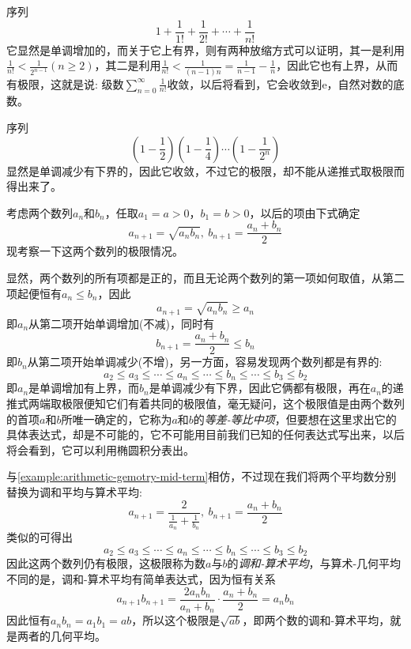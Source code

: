\begin{example}
  序列
  \[ 1+\frac{1}{1!} + \frac{1}{2!} + \cdots + \frac{1}{n!} \]
  它显然是单调增加的，而关于它上有界，则有两种放缩方式可以证明，其一是利用$\frac{1}{n!}<\frac{1}{2^{n-1}}(n \geqslant 2)$，其二是利用$\frac{1}{n!}<\frac{1}{(n-1)n}=\frac{1}{n-1}-\frac{1}{n}$，因此它也有上界，从而有极限，这就是说: 级数$\sum\limits_{n=0}^{\infty} \frac{1}{n!}$收敛，以后将看到，它会收敛到$\mathrm{e}$，自然对数的底数。
\end{example}

\begin{example}
  序列
  \[ \left( 1-\frac{1}{2} \right) \left( 1-\frac{1}{4} \right) \cdots \left( 1-\frac{1}{2^n} \right) \]
  显然是单调减少有下界的，因此它收敛，不过它的极限，却不能从递推式取极限而得出来了。
\end{example}

\begin{example}[等差-等比中项]
  \label{example:arithmetic-gemotry-mid-term}
  考虑两个数列$a_n$和$b_n$，任取$a_1=a>0$，$b_1=b>0$，以后的项由下式确定
  \[ a_{n+1} = \sqrt{a_nb_n}, \  b_{n+1}=\frac{a_n+b_n}{2} \]
  现考察一下这两个数列的极限情况。

  显然，两个数列的所有项都是正的，而且无论两个数列的第一项如何取值，从第二项起便恒有$a_n \leqslant b_n$，因此
  \[ a_{n+1} = \sqrt{a_nb_n} \geqslant a_n \]
  即$a_n$从第二项开始单调增加(不减)，同时有
  \[ b_{n+1} = \frac{a_n+b_n}{2} \leqslant b_n \]
  即$b_n$从第二项开始单调减少(不增)，另一方面，容易发现两个数列都是有界的:
  \[ a_2 \leqslant a_3 \leqslant \cdots \leqslant a_n \leqslant \cdots \leqslant b_n \leqslant \cdots \leqslant b_3 \leqslant b_2  \]
  即$a_n$是单调增加有上界，而$b_n$是单调减少有下界，因此它俩都有极限，再在$a_n$的递推式两端取极限便知它们有着共同的极限值，毫无疑问，这个极限值是由两个数列的首项$a$和$b$所唯一确定的，它称为$a$和$b$的\emph{等差-等比中项}，但要想在这里求出它的具体表达式，却是不可能的，它不可能用目前我们已知的任何表达式写出来，以后将会看到，它可以利用椭圆积分表出。
\end{example}

\begin{example}[调和-算术中项]
  \label{example:harmonic-arithmetic-mid-term}
  与\autoref{example:arithmetic-gemotry-mid-term}相仿，不过现在我们将两个平均数分别替换为调和平均与算术平均:
  \[ a_{n+1} = \frac{2}{\frac{1}{a_n}+\frac{1}{b_n}}, \  b_{n+1} = \frac{a_n+b_n}{2} \]
  类似的可得出
  \[ a_2 \leqslant a_3 \leqslant \cdots \leqslant a_n \leqslant \cdots \leqslant b_n \leqslant \cdots \leqslant b_3 \leqslant b_2  \]
  因此这两个数列仍有极限，这极限称为数$a$与$b$的\emph{调和-算术平均}，与算术-几何平均不同的是，调和-算术平均有简单表达式，因为恒有关系
  \[ a_{n+1}b_{n+1} = \frac{2a_nb_n}{a_n+b_n} \cdot \frac{a_n+b_n}{2} = a_nb_n \]
  因此恒有$a_nb_n=a_1b_1=ab$，所以这个极限是$\sqrt{ab}$，即两个数的调和-算术平均，就是两者的几何平均。
\end{example}

